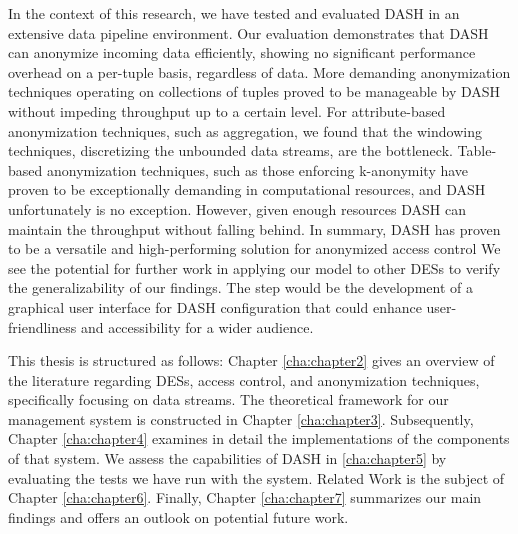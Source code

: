 In the context of this research, we have tested and evaluated \ac{DASH} in an extensive data pipeline environment. Our evaluation demonstrates that \ac{DASH} can anonymize incoming data efficiently, showing no significant performance overhead on a per-tuple basis, regardless of data. More demanding anonymization techniques operating on collections of tuples proved to be manageable by \ac{DASH} without impeding throughput up to a certain level. For attribute-based anonymization techniques, such as aggregation, we found that the windowing techniques, discretizing the unbounded data streams, are the bottleneck. Table-based anonymization techniques, such as those enforcing k-anonymity have proven to be exceptionally demanding in computational resources, and \ac{DASH} unfortunately is no exception. However, given enough resources \ac{DASH} can maintain the throughput without falling behind. In summary, \ac{DASH} has proven to be a versatile and high-performing solution for anonymized access control We see the potential for further work in applying our model to other \acp{DES} to verify the generalizability of our findings. The step would be the development of a graphical user interface for \ac{DASH} configuration that could enhance user-friendliness and accessibility for a wider audience. \par 

This thesis is structured as follows: Chapter \ref{cha:chapter2} gives an overview of the literature regarding \acp{DES}, access control, and anonymization techniques, specifically focusing on data streams. The theoretical framework for our management system is constructed in Chapter \ref{cha:chapter3}. Subsequently, Chapter \ref{cha:chapter4} examines in detail the implementations of the components of that system. We assess the capabilities of \ac{DASH} in \ref{cha:chapter5} by evaluating the tests we have run with the system. Related Work is the subject of Chapter \ref{cha:chapter6}. Finally, Chapter \ref{cha:chapter7} summarizes our main findings and offers an outlook on potential future work. 
